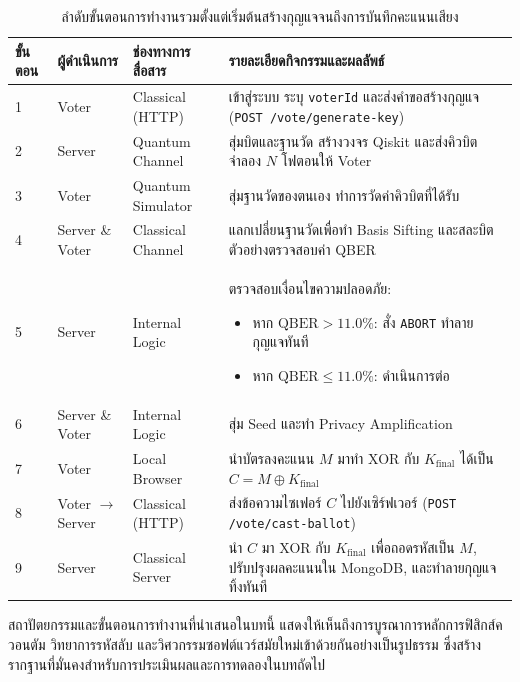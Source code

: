 \begin{table}[htbp]
\centering
\renewcommand{\arraystretch}{1.35}
\setlength{\extrarowheight}{2.5pt}
\begin{tabularx}{\textwidth}{>{\centering\arraybackslash}p{1.2cm} >{\raggedright\arraybackslash}p{2.6cm} >{\raggedright\arraybackslash}p{2.6cm} >{\raggedright\arraybackslash}X}
\hline
\textbf{ขั้นตอน} & \textbf{ผู้ดำเนินการ} & \textbf{ช่องทางการสื่อสาร} & \textbf{รายละเอียดกิจกรรมและผลลัพธ์} \\ \hline
\rowcolor{white}
1 & Voter & Classical (HTTP) & เข้าสู่ระบบ ระบุ \texttt{voterId} และส่งคำขอสร้างกุญแจ (\texttt{POST /vote/generate-key}) \\
\rowcolor[HTML]{E4E7EB}
2 & Server & Quantum Channel & สุ่มบิตและฐานวัด สร้างวงจร Qiskit และส่งคิวบิตจำลอง $N$ โฟตอนให้ Voter \\
\rowcolor{white}
3 & Voter & Quantum Simulator & สุ่มฐานวัดของตนเอง ทำการวัดค่าคิวบิตที่ได้รับ \\
\rowcolor[HTML]{E4E7EB}
4 & Server \& Voter & Classical Channel & แลกเปลี่ยนฐานวัดเพื่อทำ Basis Sifting และสละบิตตัวอย่างตรวจสอบค่า QBER \\
\rowcolor{white}
5 & Server & Internal Logic & ตรวจสอบเงื่อนไขความปลอดภัย:
\begin{itemize}
    \item หาก $\text{QBER} > 11.0\%$: สั่ง \texttt{ABORT} ทำลายกุญแจทันที
    \item หาก $\text{QBER} \le 11.0\%$: ดำเนินการต่อ
\end{itemize} \\
\rowcolor[HTML]{E4E7EB}
6 & Server \& Voter & Internal Logic & สุ่ม Seed และทำ Privacy Amplification \\
\rowcolor{white}
7 & Voter & Local Browser & นำบัตรลงคะแนน $M$ มาทำ XOR กับ $K_{\text{final}}$ ได้เป็น $C = M \oplus K_{\text{final}}$ \\
\rowcolor[HTML]{E4E7EB}
8 & Voter $\to$ Server & Classical (HTTP) & ส่งข้อความไซเฟอร์ $C$ ไปยังเซิร์ฟเวอร์ (\texttt{POST /vote/cast-ballot}) \\
\rowcolor{white}
9 & Server & Classical Server & นำ $C$ มา XOR กับ $K_{\text{final}}$ เพื่อถอดรหัสเป็น $M$, ปรับปรุงผลคะแนนใน MongoDB, และทำลายกุญแจทิ้งทันที \\
\hline
\end{tabularx}
\caption{ลำดับขั้นตอนการทำงานรวมตั้งแต่เริ่มต้นสร้างกุญแจจนถึงการบันทึกคะแนนเสียง}
\label{tab:end_to_end_flow}
\end{table}

สถาปัตยกรรมและขั้นตอนการทำงานที่นำเสนอในบทนี้ แสดงให้เห็นถึงการบูรณาการหลักการฟิสิกส์ควอนตัม วิทยาการรหัสลับ และวิศวกรรมซอฟต์แวร์สมัยใหม่เข้าด้วยกันอย่างเป็นรูปธรรม ซึ่งสร้างรากฐานที่มั่นคงสำหรับการประเมินผลและการทดลองในบทถัดไป
